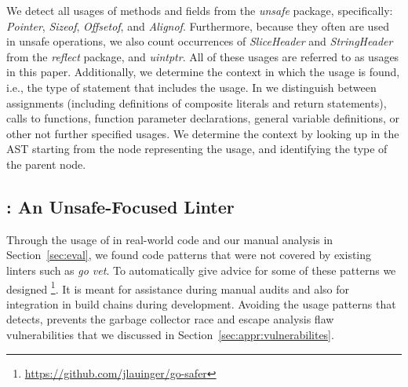 
We detect all usages of methods and fields from the \textit{unsafe} package, specifically: \textit{Pointer}, \textit{Sizeof}, \textit{Offsetof}, and \textit{Alignof}.
Furthermore, because they often are used in unsafe operations, we also count occurrences of \textit{SliceHeader} and \textit{StringHeader} from the \textit{reflect} package, and \textit{uintptr}.
All of these usages are referred to as \unsafe{} usages in this paper.
Additionally, we determine the context in which the \unsafe{} usage is found, i.e., 
the type of statement that includes the \unsafe{} usage.
In \toolUsage{} we distinguish between assignments (including definitions of composite literals and return statements), calls to functions, function parameter declarations, general variable definitions, or other not further specified usages.
We determine the context by looking up in the AST starting from the node representing the \unsafe{} usage, and identifying the type of the parent node.




\subsection{\toolSA{}: An Unsafe-Focused Linter}
\label{sec:appr:toolSA}

Through the usage of \toolUsage{} in real-world code and our manual analysis in Section~\ref{sec:eval}, we found \unsafe{} code patterns that were not covered by existing linters such as \textit{go vet}. 
To automatically give advice for some of these patterns we designed \toolSA{}\footnote{\url{https://github.com/jlauinger/go-safer}}.
It is meant for assistance during manual audits and also for integration in build chains during development.
Avoiding the \unsafe{} usage patterns that \toolSA{} detects, prevents the garbage collector race and escape analysis flaw vulnerabilities that we discussed in Section~\ref{sec:appr:vulnerabilites}.

